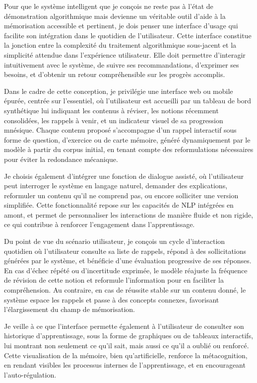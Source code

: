 \documentclass[11pt,a4paper]{report}
\begin{document}
Pour que le système intelligent que je conçois ne reste pas à l’état de démonstration algorithmique mais devienne un véritable outil d’aide à la mémorisation accessible et pertinent, je dois penser une interface d’usage qui facilite son intégration dans le quotidien de l’utilisateur. Cette interface constitue la jonction entre la complexité du traitement algorithmique sous-jacent et la simplicité attendue dans l’expérience utilisateur. Elle doit permettre d’interagir intuitivement avec le système, de suivre ses recommandations, d’exprimer ses besoins, et d’obtenir un retour compréhensible sur les progrès accomplis.

Dans le cadre de cette conception, je privilégie une interface web ou mobile épurée, centrée sur l’essentiel, où l’utilisateur est accueilli par un tableau de bord synthétique lui indiquant les contenus à réviser, les notions récemment consolidées, les rappels à venir, et un indicateur visuel de sa progression mnésique. Chaque contenu proposé s’accompagne d’un rappel interactif sous forme de question, d’exercice ou de carte mémoire, généré dynamiquement par le modèle à partir du corpus initial, en tenant compte des reformulations nécessaires pour éviter la redondance mécanique.

Je choisis également d’intégrer une fonction de dialogue assisté, où l’utilisateur peut interroger le système en langage naturel, demander des explications, reformuler un contenu qu’il ne comprend pas, ou encore solliciter une version simplifiée. Cette fonctionnalité repose sur les capacités de NLP intégrées en amont, et permet de personnaliser les interactions de manière fluide et non rigide, ce qui contribue à renforcer l’engagement dans l’apprentissage.

Du point de vue du scénario utilisateur, je conçois un cycle d’interaction quotidien où l’utilisateur consulte sa liste de rappels, répond à des sollicitations générées par le système, et bénéficie d’une évaluation progressive de ses réponses. En cas d’échec répété ou d’incertitude exprimée, le modèle réajuste la fréquence de révision de cette notion et reformule l’information pour en faciliter la compréhension. Au contraire, en cas de réussite stable sur un contenu donné, le système espace les rappels et passe à des concepts connexes, favorisant l’élargissement du champ de mémorisation.

Je veille à ce que l’interface permette également à l’utilisateur de consulter son historique d’apprentissage, sous la forme de graphiques ou de tableaux interactifs, lui montrant non seulement ce qu’il sait, mais aussi ce qu’il a oublié ou renforcé. Cette visualisation de la mémoire, bien qu’artificielle, renforce la métacognition, en rendant visibles les processus internes de l’apprentissage, et en encourageant l’auto-régulation.
\end{document}
